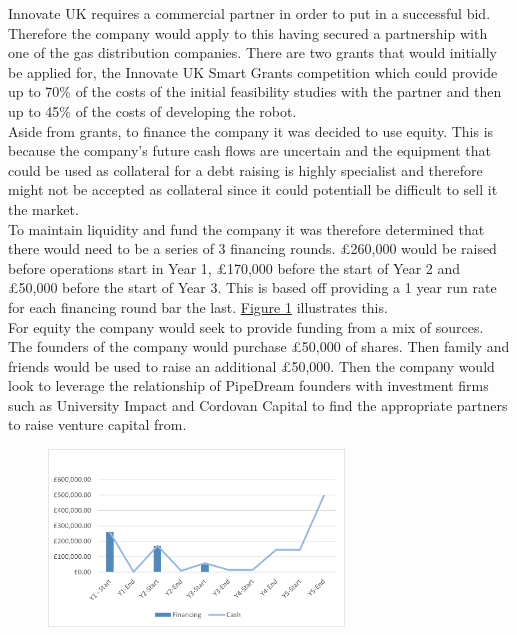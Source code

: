 \documentclass[11pt]{article}		%
\newcommand{\figref}[1]{\hyperref[#1]{Figure \ref*{#1}}}    %
\begin{document}
        Innovate UK requires a commercial partner in order to put in a successful bid. Therefore the company would apply to this having secured a partnership with one of the gas distribution companies. There are two grants that would initially be applied for, the Innovate UK Smart Grants competition which could provide up to 70\% of the costs of the initial feasibility studies with the partner and then up to 45\% of the costs of developing the robot.
          \\ 
			    Aside from grants, to finance the company it was decided to use equity. This is because the company's future cash flows are uncertain and the equipment that could be used as collateral for a debt raising is highly specialist and therefore might not be accepted as collateral since it could potentiall be difficult to sell it the market.
			    \\
			    To maintain liquidity and fund the company it was therefore determined that there would need to be a series of 3 financing rounds. £260,000 would be raised before operations start in Year 1, £170,000 before the start of Year 2 and £50,000 before the start of Year 3. This is based off providing a 1 year run rate for each financing round bar the last. \figref{liquidity} illustrates this. 
			 \\   
            For equity the company would seek to provide funding from a mix of sources. The founders of the company would purchase £50,000 of shares. Then family and friends would be used to raise an additional £50,000. Then the company would look to leverage the relationship of PipeDream founders with investment firms such as University Impact  and Cordovan Capital to find the appropriate partners to raise venture capital from.
            
               \begin{figure}[H]
    					\centering
        					\includegraphics[width=0.7\textwidth]{CashFlow}
        					\label{liquidity}
			    \end{figure}
			    
\end{document}
